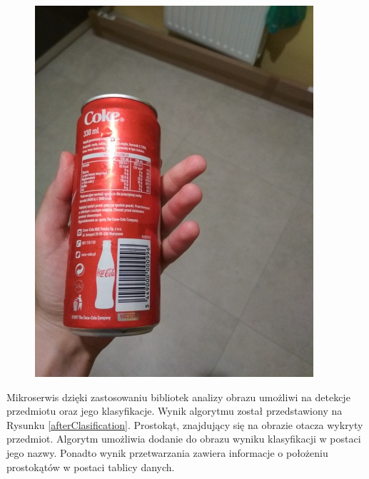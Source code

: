 {{\begin{figure}[htb]
\begin{minipage}{0.57\textwidth}
		\includegraphics[width=\linewidth]{"images/detection_sample2"}
	\end{minipage}
\end{figure}

Mikroserwis dzięki zastosowaniu bibliotek analizy obrazu umożliwi na detekcje przedmiotu oraz jego klasyfikacje. Wynik algorytmu został przedstawiony na Rysunku \ref{afterClasification}. Prostokąt, znajdujący się na obrazie otacza wykryty przedmiot. Algorytm umożliwia dodanie do obrazu wyniku klasyfikacji w postaci jego nazwy. Ponadto wynik przetwarzania zawiera informacje o położeniu prostokątów w postaci tablicy danych.


}}
